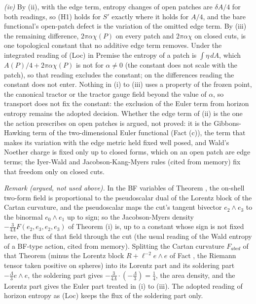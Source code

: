 \emph{(iv)} By (ii), with the edge term, entropy changes of open patches are $\delta A/4$ for both readings, so (H1) holds for $S'$ exactly where it holds for $A/4$, and the bare functional's open-patch defect is the variation of the omitted edge term. By (iii) the remaining difference, $2\pi\alpha\chi(P)$ on every patch and $2\pi\alpha\chi$ on closed cuts, is one topological constant that no additive edge term removes. Under the integrated reading of (Loc) in Premise  the entropy of a patch is $\int\eta\,dA$, which $A(P)/4 + 2\pi\alpha\chi(P)$ is not for $\alpha \neq 0$ (the constant does not scale with the patch), so that reading excludes the constant; on the differences reading the constant does not enter. Nothing in (i) to (iii) uses a property of the frozen point, the canonical tractor or the tractor gauge field beyond the value of $\alpha$, so transport does not fix the constant: the exclusion of the Euler term from horizon entropy remains the adopted decision. Whether the edge term of (ii) is the one the action prescribes on open patches is argued, not proved: it is the Gibbons-Hawking term of the two-dimensional Euler functional (Fact (c)), the term that makes its variation with the edge metric held fixed well posed, and Wald's Noether charge is fixed only up to closed forms, which on an open patch are edge terms; the Iyer-Wald and Jacobson-Kang-Myers rules (cited from memory) fix that freedom only on closed cuts.


\emph{Remark (argued, not used above).} In the BF variables of Theorem , the on-shell two-form field is proportional to the pseudoscalar dual of the Lorentz block of the Cartan curvature, and the pseudoscalar maps the cut's tangent bivector $e_{2}\wedge e_{3}$ to the binormal $e_{0}\wedge e_{1}$ up to sign; so the Jacobson-Myers density $-\tfrac{3}{4\Lambda}F(e_{2}, e_{3}, e_{2}, e_{3})$ of Theorem (i) is, up to a constant whose sign is not fixed here, the flux of that field through the cut (the usual reading of the Wald entropy of a BF-type action, cited from memory). Splitting the Cartan curvature $F_{abcd}$ of that Theorem (minus the Lorentz block $R + \ell^{-2}e\wedge e$ of Fact , the Riemann tensor taken positive on spheres) into its Lorentz part and its soldering part $-\tfrac{\Lambda}{3}e\wedge e$, the soldering part gives $-\tfrac{3}{4\Lambda}\cdot(-\tfrac{\Lambda}{3}) = \tfrac14$, the area density, and the Lorentz part gives the Euler part treated in (i) to (iii). The adopted reading of horizon entropy as (Loc) keeps the flux of the soldering part only.


